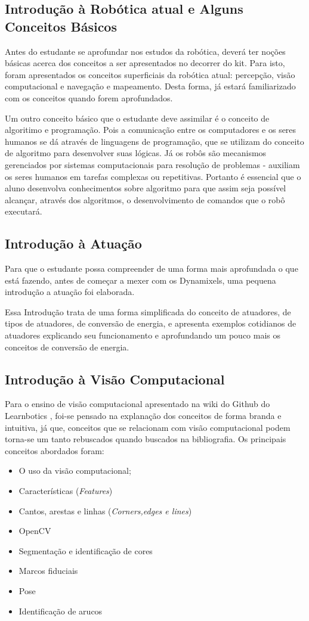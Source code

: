 \subsection{Introdução à Robótica atual e Alguns Conceitos Básicos}
Antes do estudante se aprofundar nos estudos da robótica, deverá ter noções básicas acerca dos conceitos a ser apresentados no decorrer do kit. Para isto, foram apresentados os conceitos superficiais da robótica atual: percepção, visão computacional e navegação e mapeamento. Desta forma, já estará familiarizado com os conceitos quando forem aprofundados. 

Um outro conceito básico que o estudante deve assimilar é o conceito de algoritimo e programação. Pois a comunicação entre os computadores e os seres humanos se dá através de linguagens de programação, que se utilizam do conceito de algoritmo para desenvolver suas lógicas. Já os robôs são mecanismos gerenciados por sistemas computacionais para resolução de problemas - auxiliam os seres humanos em tarefas complexas ou repetitivas. Portanto é essencial que o aluno desenvolva conhecimentos sobre algoritmo para que assim seja possível alcançar, através dos algoritmos, o desenvolvimento de comandos que o robô executará.

\subsection{Introdução à Atuação}
Para que o estudante possa compreender de uma forma mais aprofundada o que está fazendo, antes de começar a mexer com os Dynamixels, uma pequena introdução a atuação foi elaborada.

Essa Introdução trata de uma forma simplificada do conceito de atuadores, de tipos de atuadores, de conversão de energia, e apresenta exemplos cotidianos de atuadores explicando seu funcionamento e aprofundando um pouco mais os conceitos de conversão de energia. \cite{tutAtua}

\subsection{Introdução à Visão Computacional}
Para o ensino de visão computacional apresentado na wiki do Github do Learnbotics \cite{wikilearn}, foi-se pensado na explanação dos conceitos de forma branda e intuitiva, já que, conceitos que se relacionam com visão computacional podem torna-se um tanto rebuscados quando buscados na bibliografia. Os principais conceitos abordados foram:
\begin{itemize}
	\item O uso da visão computacional;
	\item Características  (\textit{Features})
	\item Cantos, arestas e linhas (\textit{Corners,edges e lines})
	\item OpenCV
	\item Segmentação e identificação de cores
	\item Marcos fiduciais
	\item Pose
	\item Identificação de arucos
	
\end{itemize}

